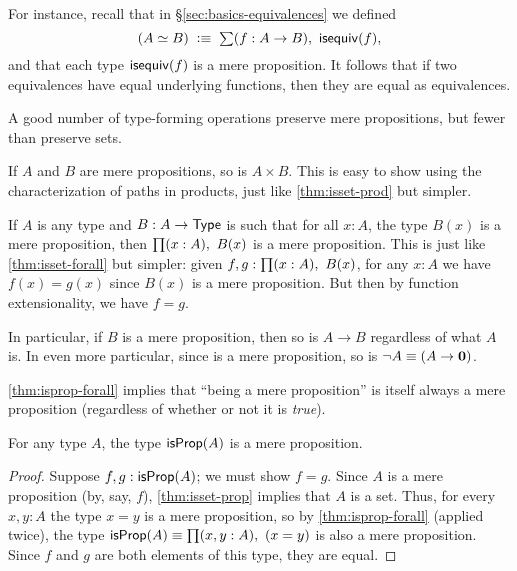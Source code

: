 For instance, recall that in \S\ref{sec:basics-equivalences} we defined
\[(\eqv A B) \;\defeq\; \sm{f:A\to B} \isequiv (f),\]
and that each type $\mathsf{isequiv} (f)$ is a mere proposition.
It follows that if two equivalences have equal underlying functions, then they are equal as equivalences.

A good number of type-forming operations preserve mere propositions, but fewer than preserve sets.

\begin{eg}
  If $A$ and $B$ are mere propositions, so is $A\times B$.
  This is easy to show using the characterization of paths in products, just like \autoref{thm:isset-prod} but simpler.
\end{eg}

\begin{eg}\label{thm:isprop-forall}
  If $A$ is any type and $B:A\to \mathsf{Type}$ is such that for all $x:A$, the type $B(x)$ is a mere proposition, then $\prd{x:A} B(x)$ is a mere proposition.
  This is just like \autoref{thm:isset-forall} but simpler: given $f,g:\prd{x:A} B(x)$, for any $x:A$ we have $f(x)=g(x)$ since $B(x)$ is a mere proposition.
  But then by function extensionality, we have $f=g$.

  In particular, if $B$ is a mere proposition, then so is $A\to B$ regardless of what $A$ is.
  In even more particular, since \emptyt is a mere proposition, so is $\neg A \equiv (A\to\mathbf{0})$.
\end{eg}

\autoref{thm:isprop-forall} implies that ``being a mere proposition'' is itself always a mere proposition (regardless of whether or not it is \emph{true}).

\begin{cor}
  For any type $A$, the type $\mathsf{isProp}(A)$ is a mere proposition.
\end{cor}
\begin{proof}
  Suppose $f,g:\mathsf{isProp}(A)$; we must show $f=g$.
  Since $A$ is a mere proposition (by, say, $f$), \autoref{thm:isset-prop} implies that $A$ is a set.
  Thus, for every $x,y:A$ the type $x=y$ is a mere proposition, so by \autoref{thm:isprop-forall} (applied twice), the type $\isprop(A)\jdeq \prd{x,y:A}(x=y)$ is also a mere proposition.
  Since $f$ and $g$ are both elements of this type, they are equal.
\end{proof}

